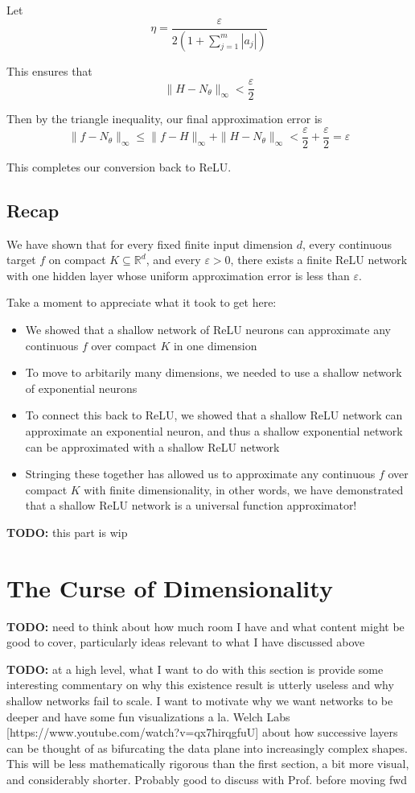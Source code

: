\documentclass{article}
\theoremstyle{definition}
\newcommand{\TODO}{\textbf{TODO: }}
\begin{document}
Let
$$\eta = \frac{\varepsilon}{2(1 + \sum_{j=1}^m |a_j|)}$$

This ensures that
$$\|H - N_\theta\|_\infty < \frac{\varepsilon}{2}$$

Then by the triangle inequality, our final approximation error is
$$\|f - N_\theta\|_\infty \le \|f - H\|_\infty + \|H - N_\theta\|_\infty < \frac{\varepsilon}{2} + \frac{\varepsilon}{2} = \varepsilon$$

This completes our conversion back to ReLU. 

\subsection{Recap}

We have shown that for every fixed finite input dimension $d$, every continuous target $f$ on compact $K \subseteq \mathbb{R}^d$, and every $\varepsilon > 0$, there exists a finite ReLU network with one hidden layer whose uniform approximation error is less than $\varepsilon$.

Take a moment to appreciate what it took to get here:
\begin{itemize}
    \item We showed that a shallow network of ReLU neurons can approximate any continuous $f$ over compact $K$ in one dimension
    \item To move to arbitarily many dimensions, we needed to use a shallow network of exponential neurons
    \item To connect this back to ReLU, we showed that a shallow ReLU network can approximate an exponential neuron, and thus a shallow exponential network can be approximated with a shallow ReLU network
    \item Stringing these together has allowed us to approximate any continuous $f$ over compact $K$ with finite dimensionality, in other words, we have demonstrated that a shallow ReLU network is a universal function approximator!
\end{itemize}

\TODO this part is wip

\section{The Curse of Dimensionality}

\TODO need to think about how much room I have and what content might be good to cover, particularly ideas relevant to what I have discussed above

\TODO at a high level, what I want to do with this section is provide some interesting commentary on why this existence result is utterly useless and why shallow networks fail to scale. I want to motivate why we want networks to be deeper and have some fun visualizations a la. Welch Labs [https://www.youtube.com/watch?v=qx7hirqgfuU] about how successive layers can be thought of as bifurcating the data plane into increasingly complex shapes. This will be less mathematically rigorous than the first section, a bit more visual, and considerably shorter. Probably good to discuss with Prof. before moving fwd
\end{document}
